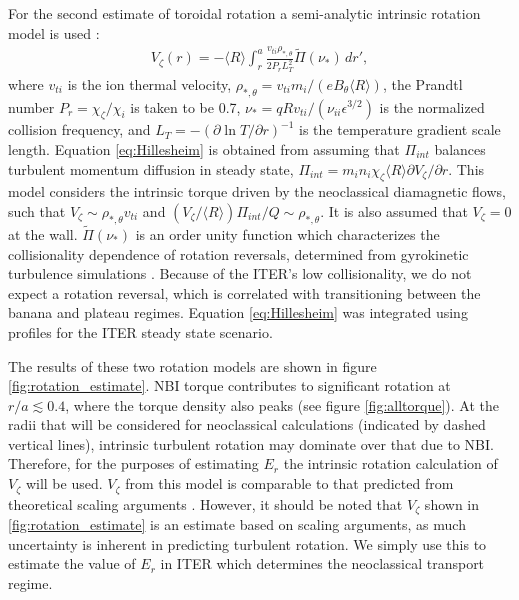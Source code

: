 \documentclass{article}
\begin{document}
For the second estimate of toroidal rotation a semi-analytic intrinsic rotation model is used \cite{Hillesheim2015}:
\begin{gather}
V_{\zeta}(r) = - \langle R \rangle \int_{r}^a \frac{v_{ti} \rho_{*,\theta}} {2 P_r L_T^2} \widetilde{\Pi} (\nu_*) \, d r',
\end{gather} \label{eq:Hillesheim}
where $v_{ti}$ is the ion thermal velocity, $\rho_{*,\theta} = v_{ti} m_i/(e B_{\theta} \langle R \rangle) $, the Prandtl number $P_r = \chi_{\zeta}/\chi_i$ is taken to be 0.7, $\nu_* = q R v_{ti}/(\nu_{ii} \epsilon^{3/2})$ is the normalized collision frequency, and $L_T = - \left( \partial \ln T/ \partial r \right)^{-1}$ is the temperature gradient scale length. Equation \ref{eq:Hillesheim} is obtained from assuming that $\Pi_{int}$ balances turbulent momentum diffusion in steady state, $\Pi_{int} = m_i n_i \chi_{\zeta} \langle R \rangle \partial V_{\zeta}/\partial r$. This model considers the intrinsic torque driven by the neoclassical diamagnetic flows, such that $V_{\zeta} \sim \rho_{*,\theta} v_{ti}$ and $(V_{\zeta}/\langle R \rangle) \Pi_{int}/Q \sim \rho_{*, \theta}$. It is also assumed that $V_{\zeta} = 0$ at the wall. %
$\widetilde{\Pi} (\nu_*)$ is an order unity function which characterizes the collisionality dependence of rotation reversals, determined from gyrokinetic turbulence simulations \cite{Barnes2013}. Because of the ITER's low collisionality, we do not expect a rotation reversal, which is correlated with transitioning between the banana and plateau regimes. Equation \ref{eq:Hillesheim} was integrated using profiles for the ITER steady state scenario. 

The results of these two rotation models are shown in figure \ref{fig:rotation_estimate}. NBI torque contributes to significant rotation at $r/a \lesssim 0.4$, where the torque density also peaks (see figure \ref{fig:alltorque}).  At the radii that will be considered for neoclassical calculations (indicated by dashed vertical lines), intrinsic turbulent rotation may dominate over that due to NBI. Therefore, for the purposes of estimating $E_r$ the intrinsic rotation calculation of $V_{\zeta}$ will be used. $V_{\zeta}$ from this model is comparable to that predicted from theoretical scaling arguments \cite{Parra2012}. However, it should be noted that $V_{\zeta}$ shown in \ref{fig:rotation_estimate} is an estimate based on scaling arguments, as much uncertainty is inherent in predicting turbulent rotation. We simply use this to estimate the value of $E_r$ in ITER which determines the neoclassical transport regime. 
\end{document}
